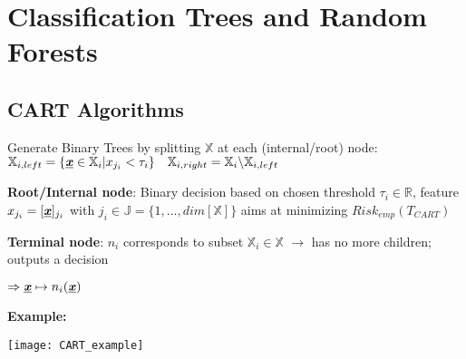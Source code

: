 \section{Classification Trees and Random Forests}

\begin{sectionbox}
	\subsection{CART Algorithms}
	Generate Binary Trees by splitting $\mathbb X$ at each (internal/root) node: $\mathbb{X}_{i,left}=\{\underline{\textbf{\textit{x}}}\in\mathbb{X}_i|x_{j_i}<\tau_i\}\quad\mathbb{X}_{i,right}=\mathbb{X}_i\backslash\mathbb{X}_{i,left}$
	
	\textbf{Root/Internal node}: Binary decision based on chosen threshold $\tau_i\in\mathbb{R}$, feature $x_{j_i}=[\underline{\textbf{\textit{x}}}]_{j_i}$ with $j_i\in\mathbb{J}=\{1,...,dim[\mathbb{X}]\}$ aims at minimizing $Risk_{emp}(T_{CART})$
	
	\textbf{Terminal node}: $n_i$ corresponds to subset $\mathbb{X}_i\in\mathbb{X}$ $\rightarrow$ has no more children; outputs a decision
	
	$\Rightarrow \underline{\textbf{\textit{x}}}\mapsto n_i(\underline{\textbf{\textit{x}}})$  

\end{sectionbox}
\begin{sectionbox}
	
	\textbf{Example:}

	\texttt{[image: CART\_example]}
	
\end{sectionbox}
